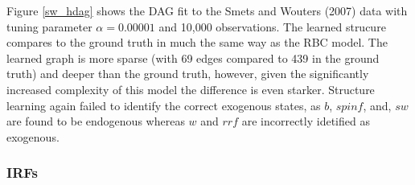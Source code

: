 \documentclass{article}
\begin{document}
Figure \ref{sw_hdag} shows the DAG fit to the Smets and Wouters (2007) data with tuning parameter $\alpha = 0.00001$ and 10,000 observations. The learned strucure compares to the ground truth in much the same way as the RBC model. The learned graph is more sparse (with 69 edges compared to 439 in the ground truth) and deeper than the ground truth, however, given the significantly increased complexity of this model the difference is even starker. Structure learning again failed to identify the correct exogenous states, as $b$, $spinf$, and, $sw$ are found to be endogenous whereas $w$ and $rrf$ are incorrectly idetified as exogenous. 

\subsubsection{IRFs}
\end{document}
